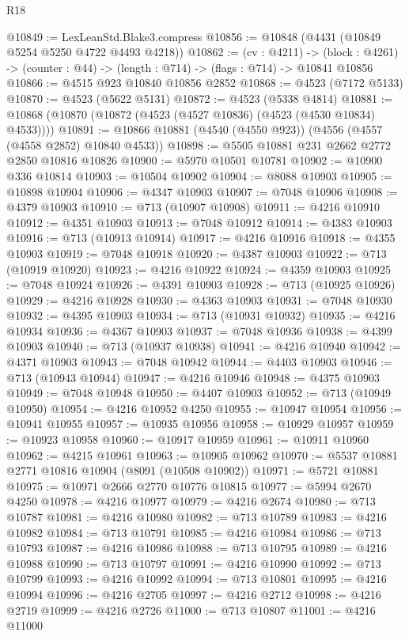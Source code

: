\begin{lexlean}{R18}
\begin{coremodule}
@10849 := LexLeanStd.Blake3.compress
@10856 := @10848 (@4431 (@10849 @5254 @5250 @4722 @4493 @4218))
@10862 := (cv : @4211) ->
  (block : @4261) -> (counter : @44) -> (length : @714) -> (flags : @714) -> @10841 @10856
@10866 := @4515 @923 @10840 @10856 @2852
@10868 := @4523 (@7172 @5133)
@10870 := @4523 (@5622 @5131)
@10872 := @4523 (@5338 @4814)
@10881 := @10868 (@10870 (@10872 (@4523 (@4527 @10836) (@4523 (@4530 @10834) @4533))))
@10891 := @10866 @10881 (@4540 (@4550 @923)) (@4556 (@4557 (@4558 @2852) @10840 @4533))
@10898 := @5505 @10881 @231 @2662 @2772 @2850 @10816 @10826
@10900 := @5970 @10501 @10781
@10902 := @10900 @336 @10814
@10903 := @10504 @10902
@10904 := @8088 @10903
@10905 := @10898 @10904
@10906 := @4347 @10903
@10907 := @7048 @10906
@10908 := @4379 @10903
@10910 := @713 (@10907 @10908)
@10911 := @4216 @10910
@10912 := @4351 @10903
@10913 := @7048 @10912
@10914 := @4383 @10903
@10916 := @713 (@10913 @10914)
@10917 := @4216 @10916
@10918 := @4355 @10903
@10919 := @7048 @10918
@10920 := @4387 @10903
@10922 := @713 (@10919 @10920)
@10923 := @4216 @10922
@10924 := @4359 @10903
@10925 := @7048 @10924
@10926 := @4391 @10903
@10928 := @713 (@10925 @10926)
@10929 := @4216 @10928
@10930 := @4363 @10903
@10931 := @7048 @10930
@10932 := @4395 @10903
@10934 := @713 (@10931 @10932)
@10935 := @4216 @10934
@10936 := @4367 @10903
@10937 := @7048 @10936
@10938 := @4399 @10903
@10940 := @713 (@10937 @10938)
@10941 := @4216 @10940
@10942 := @4371 @10903
@10943 := @7048 @10942
@10944 := @4403 @10903
@10946 := @713 (@10943 @10944)
@10947 := @4216 @10946
@10948 := @4375 @10903
@10949 := @7048 @10948
@10950 := @4407 @10903
@10952 := @713 (@10949 @10950)
@10954 := @4216 @10952 @4250
@10955 := @10947 @10954
@10956 := @10941 @10955
@10957 := @10935 @10956
@10958 := @10929 @10957
@10959 := @10923 @10958
@10960 := @10917 @10959
@10961 := @10911 @10960
@10962 := @4215 @10961
@10963 := @10905 @10962
@10970 := @5537 @10881 @2771 @10816 @10904 (@8091 (@10508 @10902))
@10971 := @5721 @10881
@10975 := @10971 @2666 @2770 @10776 @10815
@10977 := @5994 @2670 @4250
@10978 := @4216 @10977
@10979 := @4216 @2674
@10980 := @713 @10787
@10981 := @4216 @10980
@10982 := @713 @10789
@10983 := @4216 @10982
@10984 := @713 @10791
@10985 := @4216 @10984
@10986 := @713 @10793
@10987 := @4216 @10986
@10988 := @713 @10795
@10989 := @4216 @10988
@10990 := @713 @10797
@10991 := @4216 @10990
@10992 := @713 @10799
@10993 := @4216 @10992
@10994 := @713 @10801
@10995 := @4216 @10994
@10996 := @4216 @2705
@10997 := @4216 @2712
@10998 := @4216 @2719
@10999 := @4216 @2726
@11000 := @713 @10807
@11001 := @4216 @11000

\end{coremodule}
\end{lexlean}
